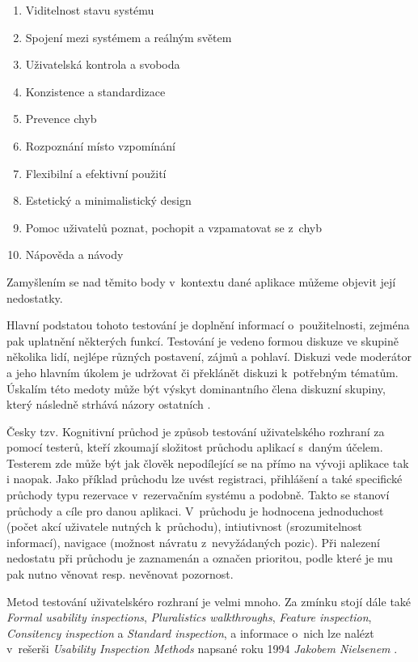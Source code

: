 \documentclass[twoside,12pt]{article}
\begin{document}
\begin{enumerate}
\item Viditelnost stavu systému
\item Spojení mezi systémem a reálným světem
\item Uživatelská kontrola a svoboda
\item Konzistence a standardizace
\item Prevence chyb
\item Rozpoznání místo vzpomínání
\item Flexibilní a efektivní použití
\item Estetický a minimalistický design
\item Pomoc uživatelů poznat, pochopit a vzpamatovat se z~chyb
\item Nápověda a návody
\end{enumerate} 

Zamyšlením se nad těmito body v~kontextu dané aplikace můžeme objevit její nedostatky.

Hlavní podstatou tohoto testování je doplnění informací o~použitelnosti, zejména pak uplatnění některých funkcí. Testování je vedeno formou diskuze ve skupině několika lidí, nejlépe různých postavení, zájmů a pohlaví. Diskuzi vede moderátor a jeho hlavním úkolem je udržovat či překlánět diskuzi k~potřebným tématům. Úskalím této medoty může být výskyt dominantního člena diskuzní skupiny, který následně strhává názory ostatních \cite{nielsen_focus_groups}.

Česky tzv. Kognitivní průchod je způsob testování uživatelského rozhraní za pomocí testerů, kteří zkoumají složitost průchodu aplikací s~daným účelem. Testerem zde může být jak člověk nepodílející se na přímo na vývoji aplikace tak i naopak. Jako příklad průchodu lze uvést registraci, přihlášení a také specifické průchody typu rezervace v~rezervačním systému a podobně. Takto se stanoví průchody a cíle pro danou aplikaci. V~průchodu je hodnocena jednoduchost (počet akcí uživatele nutných k~průchodu), intiutivnost (srozumitelnost informací), navigace (možnost návratu z~nevyžádaných pozic). Při nalezení nedostatu při průchodu je zaznamenán a označen prioritou, podle které je mu pak nutno věnovat resp. nevěnovat pozornost. 

Metod testování uživatelskéro rozhraní je velmi mnoho. Za zmínku stojí dále také \textit{Formal usability inspections}, \textit{Pluralistics walkthroughs}, \textit{Feature inspection}, \textit{Consitency inspection} a \textit{Standard inspection}, a informace o~nich lze nalézt v~rešerši \textit{Usability Inspection Methods} napsané roku 1994 \textit{Jakobem Nielsenem} \cite{nielsen_methods}. 
\end{document}
